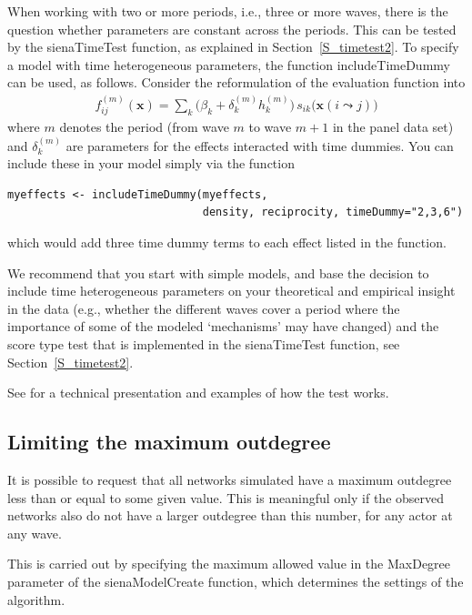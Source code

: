 \documentclass[a4paper,fleqn,11pt]{article}
\newcommand{\+}{\, + \,}
\newcommand{\sfn}[1]{\textsf{#1}}
\begin{document}
{When working with two or more periods, i.e., three or more waves,
there is the question whether parameters are constant across the periods.
This can be tested by the \sfn{sienaTimeTest} function, as explained
in Section~\ref{S_timetest2}.
To specify a model with time heterogeneous parameters, the function
\sfn{includeTimeDummy} can be used, as follows.
Consider the reformulation of the evaluation function into
\begin{align}
f^{(m)}_{ij}(\mathbf{x})= \sum_k \Big(\beta_k + \delta_k^{(m)} h_k^{(m)}\Big)
                              \,      s_{ik}\big(\mathbf{x}(i \leadsto j)\big)
\label{eq:fmij}
\end{align}
where $m$ denotes the period (from wave $m$ to wave $m+1$
in the panel data set)
and $\delta_k^{(m)}$ are parameters for the effects interacted
with time dummies. You
can include these in your model simply via the function
\begin{verbatim}
myeffects <- includeTimeDummy(myeffects,
                              density, reciprocity, timeDummy="2,3,6")
\end{verbatim}
which would add three time dummy terms to each effect listed in the function.

We recommend that you start with simple models,
and base the decision to include time heterogeneous parameters
on your theoretical and empirical insight in the data
(e.g., whether the different waves cover a period where the importance
of some of the modeled `mechanisms' may have changed) and
the score type test that is implemented in the \sfn{sienaTimeTest} function,
see Section~\ref{S_timetest2}.

See \citet{Lospinoso2011} for a technical presentation
and examples of how the test works.

\subsection{Limiting the maximum outdegree}
\label{S_maxdegree}

It is possible to request that all networks simulated have a
maximum outdegree less than or equal to some given value.
This is meaningful only if the observed networks also do
not have a larger outdegree than this number, for any actor at any wave.

This is carried out by specifying the maximum allowed value
in the \textsf{MaxDegree} parameter of the \textsf{sienaModelCreate}
function, which determines the settings of the algorithm.

}
\end{document}
